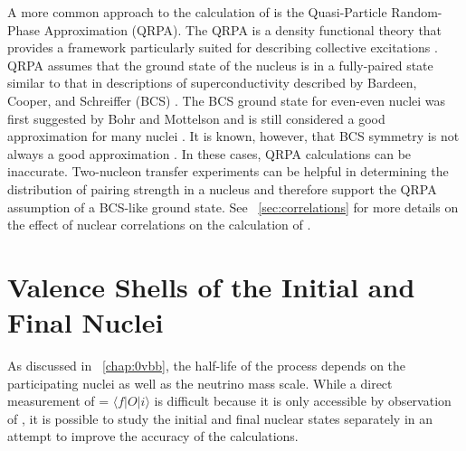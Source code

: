 A more common approach to the calculation of \NME is the Quasi-Particle Random-Phase Approximation (QRPA).  The QRPA is a density functional theory that provides a framework particularly suited for describing collective excitations \citep{Casten}.  QRPA assumes that the ground state of the nucleus is in a fully-paired state \citep{BenderSCMF} similar to that in descriptions of superconductivity described by Bardeen, Cooper, and Schreiffer (BCS) \citep{BCS}.  The BCS ground state for even-even nuclei was first suggested by Bohr and Mottelson \citep{nucleiBCS} and is still considered a good approximation for many nuclei \citep{validRegionsBCS_highMass}.  It is known, however, that BCS symmetry is not always a good approximation \citep{NambuBCS}.  In these cases, QRPA calculations can be inaccurate.  Two-nucleon transfer experiments can be helpful in determining the distribution of pairing strength in a nucleus \citep{Yoshida} and therefore support the QRPA assumption of a BCS-like ground state.  See {\sect}~\ref{sec:correlations} for more details on the effect of nuclear correlations on the calculation of \NME. 

\section{Valence Shells of the Initial and Final Nuclei}
\label{sec:valence}

As discussed in {\chap}~\ref{chap:0vbb}, the half-life of the \zvbb process depends on the participating nuclei as well as the neutrino mass scale.  While a direct measurement of \NME = $\langle f|O|i \rangle$ is difficult because it is only accessible by observation of \zvbb, it is possible to study the initial and final nuclear states separately in an attempt to improve the accuracy of the calculations.  

